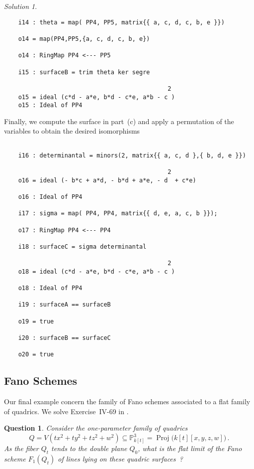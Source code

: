 \documentclass[12pt,noamsfonts]{amsart}
\def\PP{{\mathbb P}}
\newcommand{\Proj}{\operatorname{Proj}}
\newtheorem{question}{Question}
\theoremstyle{definition}
\theoremstyle{remark}
\newtheorem*{solution}{Solution}
\begin{document}
\begin{solution}
{\begin{verbatim}
    i14 : theta = map( PP4, PP5, matrix{{ a, c, d, c, b, e }})
    
    o14 = map(PP4,PP5,{a, c, d, c, b, e})
    
    o14 : RingMap PP4 <--- PP5
    
    i15 : surfaceB = trim theta ker segre
    
                                              2
    o15 = ideal (c*d - a*e, b*d - c*e, a*b - c )
    o15 : Ideal of PP4

\end{verbatim}}
\noindent Finally, we compute the surface in part~(c) and apply a
permutation of the variables to obtain the desired isomorphisms
{\scriptsize
\begin{verbatim}

    i16 : determinantal = minors(2, matrix{{ a, c, d },{ b, d, e }}) 
    
                                              2
    o16 = ideal (- b*c + a*d, - b*d + a*e, - d  + c*e)
    
    o16 : Ideal of PP4
    
    i17 : sigma = map( PP4, PP4, matrix{{ d, e, a, c, b }});
    
    o17 : RingMap PP4 <--- PP4
    
    i18 : surfaceC = sigma determinantal
    
                                              2
    o18 = ideal (c*d - a*e, b*d - c*e, a*b - c )
    
    o18 : Ideal of PP4
    
    i19 : surfaceA == surfaceB 
    
    o19 = true
    
    i20 : surfaceB == surfaceC
    
    o20 = true
\end{verbatim}}

\end{solution}

\subsection*{Fano Schemes}

Our final example concern the family of Fano
schemes associated to a flat family of quadrics.  
We solve Exercise~IV-69 in \cite{EH}.

\begin{question}
Consider the one-parameter family of quadrics 
\[ 
Q = V(tx^{2}+ty^{2}+tz^{2}+w^{2}) \subseteq \PP^{3}_{k[t]} =
\Proj\big(k[t][x,y,z,w]\big) \, .
\]
As the fiber $Q_{t}$ tends to the double plane $Q_{0}$, what is the
flat limit of the Fano scheme $F_{1}(Q_{t})$
of lines lying on these quadric surfaces~?
\end{question}
\end{document}
